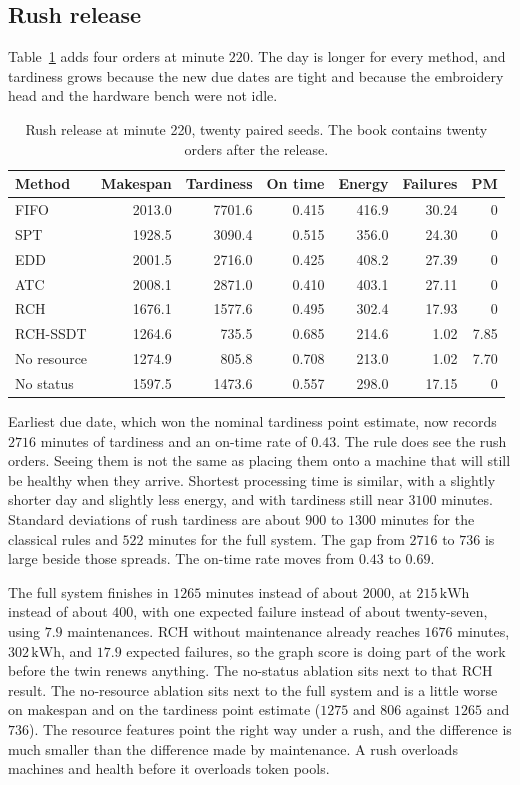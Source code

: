 \subsection{Rush release}

Table~\ref{tab:rush} adds four orders at minute \(220\). The day is longer for every method, and tardiness grows because the new due dates are tight and because the embroidery head and the hardware bench were not idle.

\begin{table}[ht]
\centering
\caption{Rush release at minute 220, twenty paired seeds. The book contains twenty orders after the release.}
\label{tab:rush}
\small
\begin{tabular}{lrrrrrr}
\toprule
Method & Makespan & Tardiness & On time & Energy & Failures & PM \\
\midrule
FIFO & 2013.0 & 7701.6 & 0.415 & 416.9 & 30.24 & 0 \\
SPT & 1928.5 & 3090.4 & 0.515 & 356.0 & 24.30 & 0 \\
EDD & 2001.5 & 2716.0 & 0.425 & 408.2 & 27.39 & 0 \\
ATC & 2008.1 & 2871.0 & 0.410 & 403.1 & 27.11 & 0 \\
RCH & 1676.1 & 1577.6 & 0.495 & 302.4 & 17.93 & 0 \\
RCH-SSDT & 1264.6 & 735.5 & 0.685 & 214.6 & 1.02 & 7.85 \\
No resource & 1274.9 & 805.8 & 0.708 & 213.0 & 1.02 & 7.70 \\
No status & 1597.5 & 1473.6 & 0.557 & 298.0 & 17.15 & 0 \\
\bottomrule
\end{tabular}
\end{table}

Earliest due date, which won the nominal tardiness point estimate, now records \(2716\) minutes of tardiness and an on-time rate of \(0.43\). The rule does see the rush orders. Seeing them is not the same as placing them onto a machine that will still be healthy when they arrive. Shortest processing time is similar, with a slightly shorter day and slightly less energy, and with tardiness still near \(3100\) minutes. Standard deviations of rush tardiness are about \(900\) to \(1300\) minutes for the classical rules and \(522\) minutes for the full system. The gap from \(2716\) to \(736\) is large beside those spreads. The on-time rate moves from \(0.43\) to \(0.69\).

The full system finishes in \(1265\) minutes instead of about \(2000\), at \(215\,\mathrm{kWh}\) instead of about \(400\), with one expected failure instead of about twenty-seven, using \(7.9\) maintenances. RCH without maintenance already reaches \(1676\) minutes, \(302\,\mathrm{kWh}\), and \(17.9\) expected failures, so the graph score is doing part of the work before the twin renews anything. The no-status ablation sits next to that RCH result. The no-resource ablation sits next to the full system and is a little worse on makespan and on the tardiness point estimate (\(1275\) and \(806\) against \(1265\) and \(736\)). The resource features point the right way under a rush, and the difference is much smaller than the difference made by maintenance. A rush overloads machines and health before it overloads token pools.

